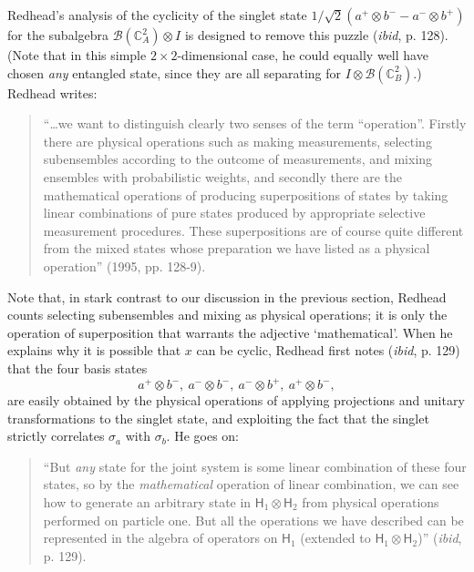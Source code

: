 \documentclass[12pt]{article}
\newcommand{\alg}[1]{\mbox{$\mathcal{#1}$}}
\newcommand{\hil}[1]{\mbox{$\mathsf{#1}$}}
\begin{document}
Redhead's analysis of the cyclicity of 
the singlet state $1/\sqrt{2}(a^{+}\otimes b^{-}-a^{-}\otimes b^{+})$ for 
the subalgebra $\alg{B}({\mathbb{C}}_{A}^{2})\otimes I$
is designed to remove this puzzle (\emph{ibid}, p. 128).  
(Note that in this simple $2\times 2$-dimensional case, he could equally well have 
chosen \emph{any} entangled state, since they are all separating for 
$I\otimes\alg{B}({\mathbb{C}}_{B}^{2})$.)  Redhead writes:
\begin{quote}
``\ldots we 
 want to distinguish clearly two senses of the term ``operation''.  
 Firstly there are physical operations such as making measurements, 
 selecting subensembles according to the outcome of measurements, and 
 mixing ensembles with probabilistic weights, and secondly there are 
 the mathematical operations of producing superpositions of states by 
 taking linear combinations of pure states produced by appropriate 
 selective measurement procedures.  These superpositions are of course 
 quite different from the mixed states whose preparation we have 
 listed as a physical operation'' (1995, pp. 128-9).
\end{quote}
Note that, in stark contrast to our discussion in the previous section,
 Redhead counts selecting subensembles and mixing as 
physical operations; it is only the operation of 
superposition that warrants the adjective `mathematical'.  When he 
explains why it is possible that $x$ can be cyclic, Redhead first 
notes (\emph{ibid}, p. 129) that the four basis states 
\begin{equation} \label{eq:states}
a^{+}\otimes b^{-},\ a^{-}\otimes b^{-},\ a^{-}\otimes b^{+},\ a^{+}\otimes 
b^{-},
\end{equation}
are easily obtained by the physical operations of applying 
projections and unitary transformations to the singlet state, and 
exploiting the fact that the singlet strictly correlates $\sigma_{a}$ with $\sigma_{b}$.  He goes on:
\begin{quote}      
``But \emph{any} state for the joint system is some linear combination 
of these four states, so by 
 the \emph{mathematical} operation of linear combination, we can see 
 how to generate an arbitrary state in 
 $\hil{H}_{1}\otimes\hil{H}_{2}$ from physical operations performed 
 on particle one.  But all the operations we have described can be 
 represented in the algebra of operators on $\hil{H}_{1}$ (extended to 
 $\hil{H}_{1}\otimes\hil{H}_{2}$)''  (\emph{ibid}, p. 129).
 \end{quote}
 
\end{document}
